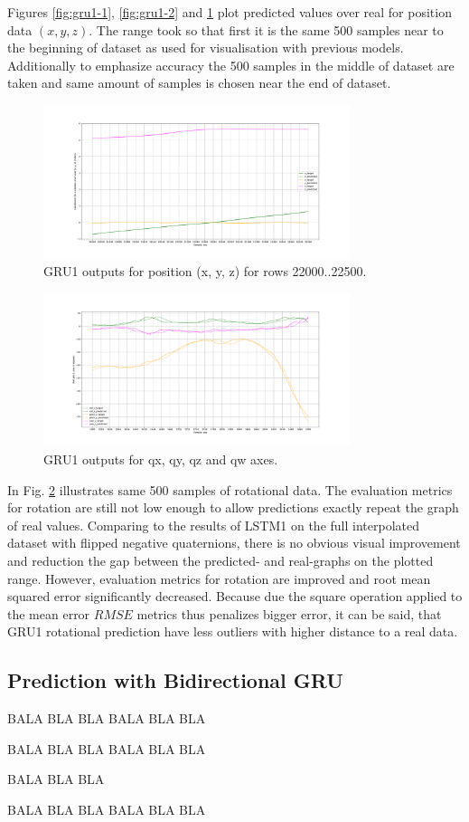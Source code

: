 Figures \ref{fig:gru1-1},  \ref{fig:gru1-2} and \ref{fig:gru1-3} plot predicted values over real for position data $(x, y, z)$. The range took so that first it is the same 500 samples near to the beginning of dataset as used for visualisation with previous models. Additionally to emphasize accuracy the 500 samples in the middle of dataset are taken and same amount of samples is chosen near the end of dataset. 
\begin{figure}[t!]
	\begin{center}
		\includegraphics[width=0.8\textwidth, keepaspectratio]{gfx/gru1-xyz_position_21000.pdf}
		\caption{GRU1 outputs for position (x, y, z) for rows 22000..22500.}
		\label{fig:gru1-3}
	\end{center}
\end{figure}
\begin{figure}[t!]
	\begin{center}
		\includegraphics[width=0.8\textwidth, keepaspectratio]{gfx/gru1-roll_pitch_yaw_accuracy.pdf}
		\caption{GRU1 outputs for qx, qy, qz and qw axes.}
		\label{fig:gru1-4}
	\end{center}
\end{figure}
In Fig. \ref{fig:gru1-4} illustrates same 500 samples of rotational data. The evaluation metrics for rotation are still not low enough to allow predictions exactly repeat the graph of real values. Comparing to the results of LSTM1 on the full interpolated dataset with flipped negative quaternions, there is no obvious visual improvement and reduction the gap between the predicted- and real-graphs on the plotted range. However, evaluation metrics for rotation are improved and root mean squared error significantly decreased. Because due the square operation applied to the mean error $RMSE$ metrics thus penalizes bigger error, it can be said, that GRU1 rotational prediction have less outliers with higher distance to a real data. 

 
\subsection{Prediction with Bidirectional GRU}
\label{sec:eval:experiments:bi-gru}

BALA BLA BLA
BALA BLA BLA

BALA BLA BLA
BALA BLA BLA

BALA BLA BLA

BALA BLA BLA
BALA BLA BLA